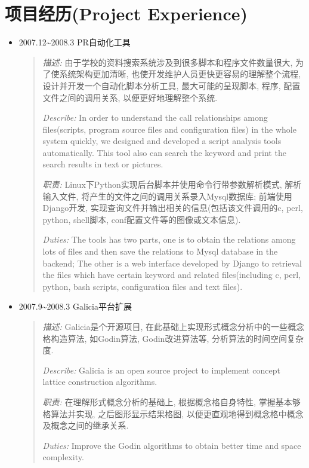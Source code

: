 \documentclass[letterpaper,10pt,english]{manual}
\begin{document}
\section{项目经历(Project Experience)}
\begin{itemize}
\item {} 
2007.12\textasciitilde{}2008.3 PR自动化工具
\begin{quote}

\emph{描述:} 由于学校的资料搜索系统涉及到很多脚本和程序文件数量很大, 为了使系统架构更加清晰, 也使开发维护人员更快更容易的理解整个流程, 设计并开发一个自动化脚本分析工具, 最大可能的呈现脚本, 程序, 配置文件之间的调用关系, 以便更好地理解整个系统.

\emph{Describe:} In order to understand the call relationships among files(scripts, program source files and configuration files) in the whole system quickly, we designed and developed a script analysis tools automatically. This tool also can search the keyword and print the search results in text or pictures.

\emph{职责:} Linux下Python实现后台脚本并使用命令行带参数解析模式, 解析输入文件, 将产生的文件之间的调用关系录入Mysql数据库; 前端使用Django开发, 实现查询文件并输出相关的信息(包括该文件调用的c, perl, python, shell脚本, conf配置文件等的图像或文本信息).

\emph{Duties:} The tools has two parts, one is to obtain the relations among lots of files and then save the relations to Mysql database in the backend; The other is a web interface developed by Django to retrieval the files which have certain keyword and related files(including c, perl, python, bash scripts, configuration files and text files).
\end{quote}

\item {} 
2007.9\textasciitilde{}2008.3 Galicia平台扩展
\begin{quote}

\emph{描述:} Galicia是个开源项目, 在此基础上实现形式概念分析中的一些概念格构造算法, 如Godin算法, Godin改进算法等, 分析算法的时间空间复杂度.

\emph{Describe:} Galicia is an open source project to implement concept lattice construction algorithms.

\emph{职责:} 在理解形式概念分析的基础上, 根据概念格自身特性, 掌握基本够格算法并实现, 之后图形显示结果格图, 以便更直观地得到概念格中概念及概念之间的继承关系.

\emph{Duties:} Improve the Godin algorithms to obtain better time and space complexity.
\end{quote}


\end{itemize}
\end{document}
